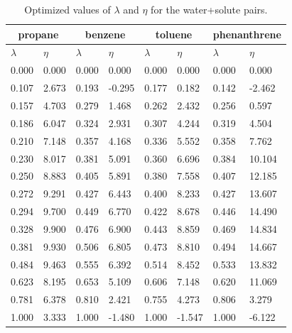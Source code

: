 \FloatBarrier
\begin{table}[h]
	\centering
	\caption{Optimized values of $\lambda $ and $\eta $ for the water+solute pairs. }
	\label{tbl:lambdawater}
	\begin{tabular}{llllllll}
		\hline\hline
		\multicolumn{2}{c}{propane}& \multicolumn{2}{c}{benzene}& \multicolumn{2}{c}{toluene}& \multicolumn{2}{c}{phenanthrene}\\
		\hline\hline
		$\lambda$ & $\eta$ & $\lambda$ & $\eta$  & $\lambda$ & $\eta$  & $\lambda$ & $\eta$ \\ 
		\hline\hline
		0.000    &    0.000    &    0.000    &    0.000    &    0.000    &    0.000    &    0.000    &    0.000    \\
		0.107    &    2.673    &    0.193    &    -0.295    &    0.177    &    0.182    &    0.142    &    -2.462    \\
		0.157    &    4.703    &    0.279    &    1.468    &    0.262    &    2.432    &    0.256    &    0.597    \\
		0.186    &    6.047    &    0.324    &    2.931    &    0.307    &    4.244    &    0.319    &    4.504    \\
		0.210    &    7.148    &    0.357    &    4.168    &    0.336    &    5.552    &    0.358    &    7.762    \\
		0.230    &    8.017    &    0.381    &    5.091    &    0.360    &    6.696    &    0.384    &    10.104    \\
		0.250    &    8.883    &    0.405    &    5.891    &    0.380    &    7.558    &    0.407    &    12.185    \\
		0.272    &    9.291    &    0.427    &    6.443    &    0.400    &    8.233    &    0.427    &    13.607    \\
		0.294    &    9.700    &    0.449    &    6.770    &    0.422    &    8.678    &    0.446    &    14.490    \\
		0.328    &    9.900    &    0.476    &    6.900    &    0.443    &    8.859    &    0.469    &    14.834    \\
		0.381    &    9.930    &    0.506    &    6.805    &    0.473    &    8.810    &    0.494    &    14.667    \\
		0.484    &    9.463    &    0.555    &    6.392    &    0.514    &    8.452    &    0.533    &    13.832    \\
		0.623    &    8.195    &    0.653    &    5.109    &    0.606    &    7.148    &    0.620    &    11.069    \\
		0.781    &    6.378    &    0.810    &    2.421    &    0.755    &    4.273    &    0.806    &    3.279    \\
		1.000    &    3.333    &    1.000    &    -1.480    &    1.000    &    -1.547    &    1.000    &    -6.122    \\        
		\hline\hline
	\end{tabular}
\end{table}

